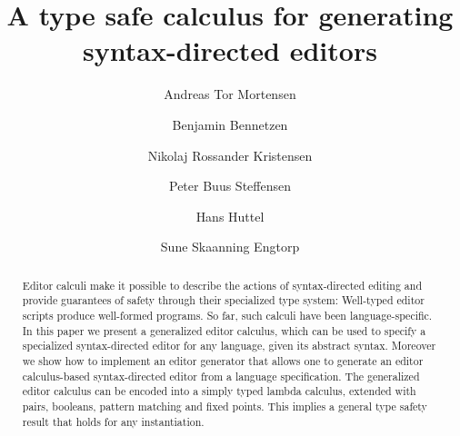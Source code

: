 \documentclass[sigplan,review]{acmart}
\begin{document}
\title{A type safe calculus for generating
  syntax-directed editors}



\author{Andreas Tor Mortensen}


\author{Benjamin Bennetzen}


\author{Nikolaj Rossander Kristensen}

\author{Peter Buus Steffensen}
\authornotemark[1]


\author{Hans Huttel}
\author{Sune Skaanning Engtorp}
\authornotemark[2]



\renewcommand{\shortauthors}{Bennetzen et al.}

\begin{abstract}

  Editor calculi make it possible to describe the actions of
  syntax-directed editing and provide guarantees of safety through
  their specialized type system: Well-typed editor scripts produce
  well-formed programs. So far, such calculi have been
  language-specific. In this paper we present a generalized editor
  calculus, which can be used to specify a specialized syntax-directed
  editor for any language, given its abstract syntax. Moreover we show
  how to implement an editor generator that allows one to generate an
  editor calculus-based syntax-directed editor from a language
  specification. The generalized editor calculus can be encoded into a
  simply typed lambda calculus, extended with pairs, booleans, pattern
  matching and fixed points. This implies a general type safety result
  that holds for any instantiation.
\end{abstract}
\end{document}
